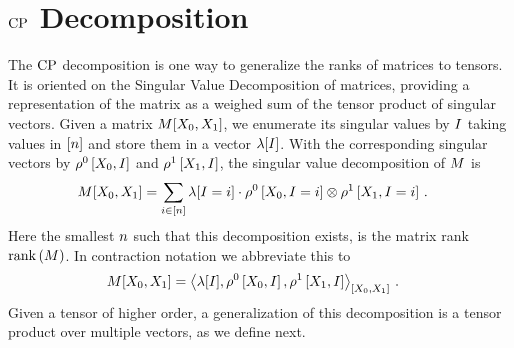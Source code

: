 


\section{$\mathrm{CP}$ Decomposition}

The $\mathrm{CP}$ decomposition is one way to generalize the ranks of matrices to tensors.
It is oriented on the Singular Value Decomposition of matrices, providing a representation of the matrix as a weighed sum of the tensor product of singular vectors.
Given a matrix $M[X_{0},X_{1}]$, we enumerate its singular values by $I$ taking values in $[n]$ and store them in a vector $\lambda[I]$.
With the corresponding singular vectors by $\rho^{0}\left[X_{0},I\right]$ and $\rho^{1}\left[X_{1},I\right]$, the singular value decomposition of $M$ is
\begin{align*}
    M[X_{0},X_{1}]
    &= \sum_{i\in[n]} \lambda[I=i] \cdot \rho^{0}\left[X_{0},I=i\right] \otimes \rho^{1}\left[X_{1},I=i\right] \, .
\end{align*}
Here the smallest $n$ such that this decomposition exists, is the matrix rank $\mathrm{rank}\left(M\right)$.
In contraction notation we abbreviate this to
\begin{align*}
    M[X_{0},X_{1}]
    &= \left\langle \lambda[I],\rho^{0}\left[X_{0},I\right],\rho^{1}\left[X_{1},I\right]\right\rangle_{\left[ X_{0},X_{1} \right]} \, .
\end{align*}
Given a tensor of higher order, a generalization of this decomposition is a tensor product over multiple vectors, as we define next.


